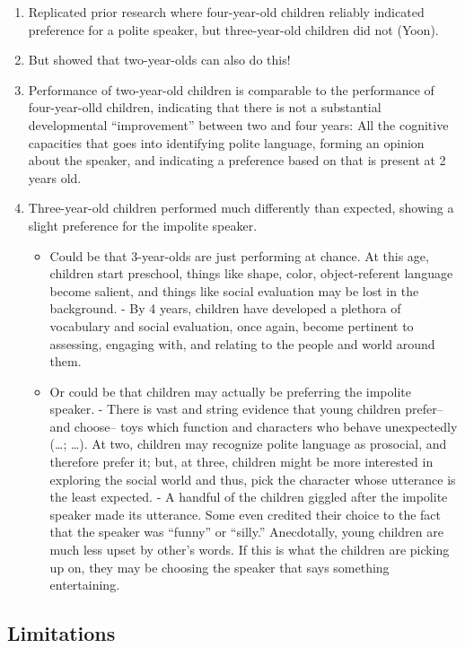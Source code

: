 \documentclass[
  english,
  man,floatsintext]{apa6}
\begin{document}
\begin{enumerate}
\def\labelenumi{\arabic{enumi}.}
\item
  Replicated prior research where four-year-old children reliably indicated preference for a polite speaker, but three-year-old children did not (Yoon).
\item
  But showed that two-year-olds can also do this!
\item
  Performance of two-year-old children is comparable to the performance of four-year-olld children, indicating that there is not a substantial developmental ``improvement'' between two and four years: All the cognitive capacities that goes into identifying polite language, forming an opinion about the speaker, and indicating a preference based on that is present at 2 years old.
\item
  Three-year-old children performed much differently than expected, showing a slight preference for the impolite speaker.

  \begin{itemize}
  \item
    Could be that 3-year-olds are just performing at chance. At this age, children start preschool, things like shape, color, object-referent language become salient, and things like social evaluation may be lost in the background.
    - By 4 years, children have developed a plethora of vocabulary and social evaluation, once again, become pertinent to assessing, engaging with, and relating to the people and world around them.
  \item
    Or could be that children may actually be preferring the impolite speaker.
    - There is vast and string evidence that young children prefer--and choose-- toys which function and characters who behave unexpectedly (\ldots; \ldots). At two, children may recognize polite language as prosocial, and therefore prefer it; but, at three, children might be more interested in exploring the social world and thus, pick the character whose utterance is the least expected.
    - A handful of the children giggled after the impolite speaker made its utterance. Some even credited their choice to the fact that the speaker was ``funny'' or ``silly.'' Anecdotally, young children are much less upset by other's words. If this is what the children are picking up on, they may be choosing the speaker that says something entertaining.
  \end{itemize}
\end{enumerate}

\hypertarget{limitations}{%
\subsection{Limitations}\label{limitations}}
\end{document}
